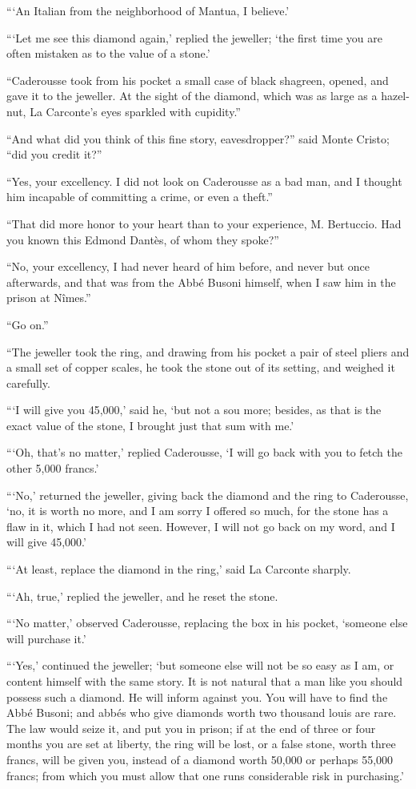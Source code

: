 “‘An Italian from the neighborhood of Mantua, I believe.’

“‘Let me see this diamond again,’ replied the jeweller; ‘the first time
you are often mistaken as to the value of a stone.’

“Caderousse took from his pocket a small case of black shagreen,
opened, and gave it to the jeweller. At the sight of the diamond, which
was as large as a hazel-nut, La Carconte’s eyes sparkled with
cupidity.”

“And what did you think of this fine story, eavesdropper?” said Monte
Cristo; “did you credit it?”

“Yes, your excellency. I did not look on Caderousse as a bad man, and I
thought him incapable of committing a crime, or even a theft.”

“That did more honor to your heart than to your experience, M.
Bertuccio. Had you known this Edmond Dantès, of whom they spoke?”

“No, your excellency, I had never heard of him before, and never but
once afterwards, and that was from the Abbé Busoni himself, when I saw
him in the prison at Nîmes.”

“Go on.”

“The jeweller took the ring, and drawing from his pocket a pair of
steel pliers and a small set of copper scales, he took the stone out of
its setting, and weighed it carefully.

“‘I will give you 45,000,’ said he, ‘but not a sou more; besides, as
that is the exact value of the stone, I brought just that sum with me.’

“‘Oh, that’s no matter,’ replied Caderousse, ‘I will go back with you
to fetch the other 5,000 francs.’

“‘No,’ returned the jeweller, giving back the diamond and the ring to
Caderousse, ‘no, it is worth no more, and I am sorry I offered so much,
for the stone has a flaw in it, which I had not seen. However, I will
not go back on my word, and I will give 45,000.’

“‘At least, replace the diamond in the ring,’ said La Carconte sharply.

“‘Ah, true,’ replied the jeweller, and he reset the stone.

“‘No matter,’ observed Caderousse, replacing the box in his pocket,
‘someone else will purchase it.’

“‘Yes,’ continued the jeweller; ‘but someone else will not be so easy
as I am, or content himself with the same story. It is not natural that
a man like you should possess such a diamond. He will inform against
you. You will have to find the Abbé Busoni; and abbés who give diamonds
worth two thousand louis are rare. The law would seize it, and put you
in prison; if at the end of three or four months you are set at
liberty, the ring will be lost, or a false stone, worth three francs,
will be given you, instead of a diamond worth 50,000 or perhaps 55,000
francs; from which you must allow that one runs considerable risk in
purchasing.’

